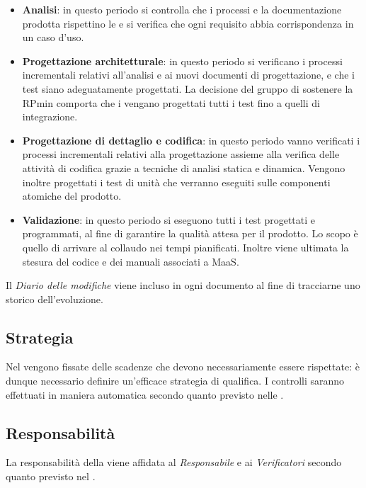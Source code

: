 \begin{itemize}
	\item \textbf{Analisi}: in questo periodo si controlla che i processi e la documentazione prodotta rispettino le \NormeDiProgetto{} e si verifica che ogni requisito abbia corrispondenza in un caso d’uso.
	\item \textbf{Progettazione architetturale}: in questo periodo si verificano i processi incrementali relativi all'analisi e ai nuovi documenti di progettazione, e che i test siano adeguatamente progettati. La decisione del gruppo di sostenere la RPmin comporta che i vengano progettati tutti i test fino a quelli di integrazione.
	\item \textbf{Progettazione di dettaglio e codifica}: in questo periodo vanno verificati i processi incrementali relativi alla progettazione assieme alla verifica delle attività di codifica grazie a tecniche di analisi statica e dinamica. Vengono inoltre progettati i test di unità che verranno eseguiti sulle componenti atomiche del prodotto.
	\item \textbf{Validazione}: in questo periodo si eseguono tutti i test progettati e programmati, al fine di garantire la qualità attesa per il prodotto. Lo scopo è quello di arrivare al collaudo nei tempi pianificati. Inoltre viene ultimata la stesura del codice e dei manuali associati a MaaS.
\end{itemize}

Il \textit{Diario delle modifiche} viene incluso in ogni documento al fine di tracciarne uno storico dell'evoluzione.

\subsection{Strategia}
Nel \PianoDiProgetto{} vengono fissate delle scadenze che devono necessariamente essere rispettate: è dunque necessario definire un'efficace strategia di qualifica. I controlli saranno effettuati in maniera automatica secondo quanto previsto nelle \NormeDiProgetto. 

\subsection{Responsabilità}
La responsabilità della  viene affidata al \textit{Responsabile} e ai \textit{Verificatori} secondo quanto previsto nel \PianoDiProgetto.


